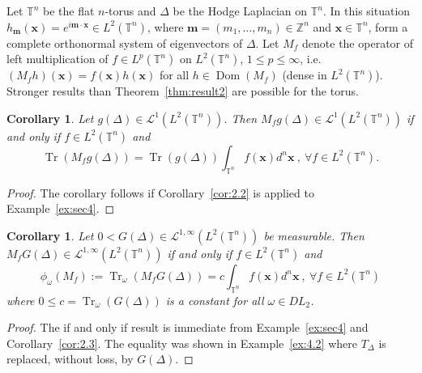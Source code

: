 \documentclass[final,1p]{elsarticle}
\numberwithin{equation}{section}
\theoremstyle{plain}
\newtheorem{cor}[thm]{Corollary}
\theoremstyle{definition}
\begin{document}
Let ${\ensuremath{\mathbb{T}}}^n$ be the flat $n$-torus and $\Delta$ be the Hodge Laplacian on ${\ensuremath{\mathbb{T}}}^n$. In this situation
$h_{\mathbf{m}}(\mathbf{x}) = e^{i \mathbf{m} \cdot \mathbf{x}} \in L^2({\ensuremath{\mathbb{T}}}^n)$,
where $\mathbf{m} = (m_1,\ldots,m_n) \in {\ensuremath{\mathbb{Z}}}^n$ and $\mathbf{x} \in {\ensuremath{\mathbb{T}}}^n$,
form a complete orthonormal system of eigenvectors of $\Delta$.
Let $M_f$ denote the operator of left multiplication of $f \in L^p({\ensuremath{\mathbb{T}}}^n)$ on $L^2({\ensuremath{\mathbb{T}}}^n)$, $1 \leq p \leq \infty$, i.e.~$(M_fh)(\mathbf{x}) = f(\mathbf{x})h(\mathbf{x})$
for all $h \in \operatorname{Dom}(M_f)$ (dense in $L^2({\ensuremath{\mathbb{T}}}^n)$).  Stronger results
than Theorem~\ref{thm:result2} are possible for the torus.

\begin{cor} \label{cor:3.2}
Let $g(\Delta) \in \mathcal{L}^1(L^2({\ensuremath{\mathbb{T}}}^n))$.  Then $M_f g(\Delta) \in \mathcal{L}^1(L^2({\ensuremath{\mathbb{T}}}^n))$ if and only if
$f \in L^2({\ensuremath{\mathbb{T}}}^n)$ and
$$
\operatorname{Tr}(M_fg(\Delta)) = \operatorname{Tr}(g(\Delta)) \int_{{\ensuremath{\mathbb{T}}}^n} f(\mathbf{x}) d^n \mathbf{x} \ , \ {\ensuremath{\forall}} f \in L^2({\ensuremath{\mathbb{T}}}^n) .
$$
\end{cor}
\begin{proof}
  The corollary follows if Corollary~\ref{cor:2.2} is applied to
  Example~\ref{ex:sec4}.
\end{proof}

\begin{cor} \label{cor:3.3}
Let $0 < G(\Delta) \in \mathcal{L}^{1,\infty}(L^2({\ensuremath{\mathbb{T}}}^n))$ be measurable.  Then $M_f G(\Delta) \in \mathcal{L}^{1,\infty}(L^2({\ensuremath{\mathbb{T}}}^n))$ if and only if $f \in L^2({\ensuremath{\mathbb{T}}}^n)$ and
$$
\phi_\omega(M_f) := \operatorname{Tr}_{\omega}(M_fG(\Delta)) = c \int_{{\ensuremath{\mathbb{T}}}^n} f(\mathbf{x}) d^n \mathbf{x} \ , \ {\ensuremath{\forall}} f \in L^2({\ensuremath{\mathbb{T}}}^n)
$$
where $0 \leq c = \operatorname{Tr}_{\omega}(G(\Delta))$ is a constant for all $\omega \in DL_2$.
\end{cor}
\begin{proof}
  The if and only if result is immediate from Example~\ref{ex:sec4}
  and Corollary~\ref{cor:2.3}.  The equality was shown in Example~\ref{ex:4.2} where $T_\Delta$ is replaced, without loss, by $G(\Delta)$.
\end{proof}
\end{document}

